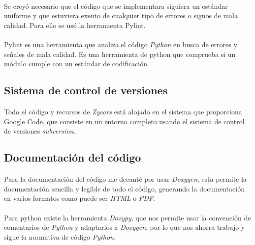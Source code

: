 \documentclass[a4paper,11pt]{article} %
\begin{document}
\paragraph{}
Se creyó necesario que el código que se implementara siguiera un estándar
uniforme y que estuviera exento de cualquier tipo de 
errores o signos de mala calidad. Para ello se usó la herramienta Pylint.

\paragraph{}
Pylint es una herramienta que analiza el código \emph{Python} en busca de errores y señales de mala calidad. Es una herramienta 
de python que comprueba si un módulo cumple con un estándar de codificación.

\subsection{Sistema de control de versiones}

\paragraph{}
Todo el código y recursos de \emph{Zycars} está alojado en el sistema que proporciona Google Code, que consiste en un entorno completo
usando el sistema de control de versiones \emph{subversion}.

\subsection{Documentación del código}

\paragraph{}
Para la documentación del código me decanté por usar \emph{Doxygen}, esta permite la documentación sencilla y legible de todo el 
código, generando la documentación en varios formatos como puede ser \emph{HTML} o \emph{PDF}.

\paragraph{}
Para python existe la herramienta \emph{Doxypy}, que nos permite usar la convención de comentarios de \emph{Python} y adaptarlos a
\emph{Doxygen}, por lo que nos ahorra trabajo y sigue la normativa de código \emph{Python}.
\end{document}
